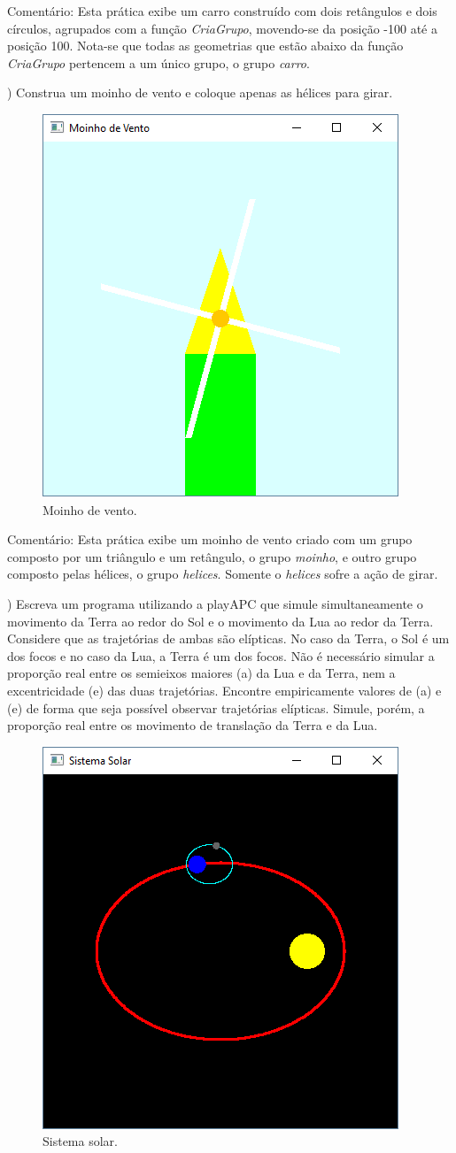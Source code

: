 \begin{renumerate}
 Comentário: Esta prática exibe um carro construído com dois retângulos e dois círculos, agrupados com a função \emph{CriaGrupo}, movendo-se da posição -100 até a posição 100. Nota-se que todas as geometrias que estão abaixo da função \emph{CriaGrupo} pertencem a um único grupo, o grupo \emph{carro}.
%

\item)
Construa um moinho de vento e coloque apenas as hélices para girar.
  \label{ex:cap01_ex7}

  \begin{figure}[H]
    \centerline{\includegraphics[width=.3\textwidth]{img/cap1_ex7.png}}
    \caption{Moinho de vento.}
    \label{fig:cap01_ex7}
  \end{figure}

  Comentário: Esta prática exibe um moinho de vento criado com um grupo composto por um triângulo e um retângulo, o grupo \emph{moinho}, e outro grupo composto pelas hélices, o grupo \emph{helices}. Somente o \emph{helices} sofre a ação de girar. 
%

\item)
Escreva um programa utilizando a playAPC que simule simultaneamente o movimento da Terra ao redor do Sol e o movimento da Lua ao redor da Terra. Considere que as trajetórias de ambas são elípticas. No caso da Terra, o Sol é um dos focos e no caso da Lua, a Terra é um dos focos. Não é necessário simular a proporção real entre os semieixos maiores (a) da Lua e da Terra, nem a excentricidade (e) das duas trajetórias. Encontre empiricamente valores de (a) e (e) de forma que seja possível observar trajetórias elípticas. Simule, porém, a proporção real entre os movimento de translação da Terra e da Lua.
  \label{ex:cap01_ex24}

  \begin{figure}[H]
    \centerline{\includegraphics[width=.3\textwidth]{img/cap1_ex24.png}}
    \caption{Sistema solar.}
    \label{fig:cap01_ex24}
  \end{figure}


\end{renumerate}
